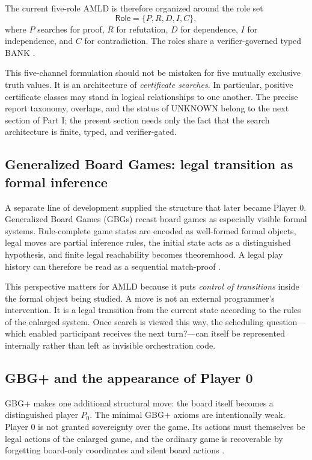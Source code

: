 \documentclass[11pt]{article}
\begin{document}
The current five-role AMLD is therefore organized around the role set
\[
\mathsf{Role}=\{P,R,D,I,C\},
\]
where $P$ searches for proof, $R$ for refutation, $D$ for dependence, $I$ for independence, and $C$ for contradiction. The roles share a verifier-governed typed BANK \cite{roundrobin}.

This five-channel formulation should not be mistaken for five mutually exclusive truth values. It is an architecture of \emph{certificate searches}. In particular, positive certificate classes may stand in logical relationships to one another. The precise report taxonomy, overlaps, and the status of UNKNOWN belong to the next section of Part I; the present section needs only the fact that the search architecture is finite, typed, and verifier-gated.

\subsection{Generalized Board Games: legal transition as formal inference}

A separate line of development supplied the structure that later became Player 0. Generalized Board Games (GBGs) recast board games as especially visible formal systems. Rule-complete game states are encoded as well-formed formal objects, legal moves are partial inference rules, the initial state acts as a distinguished hypothesis, and finite legal reachability becomes theoremhood. A legal play history can therefore be read as a sequential match-proof \cite{gbg}.

This perspective matters for AMLD because it puts \emph{control of transitions} inside the formal object being studied. A move is not an external programmer's intervention. It is a legal transition from the current state according to the rules of the enlarged system. Once search is viewed this way, the scheduling question---which enabled participant receives the next turn?---can itself be represented internally rather than left as invisible orchestration code.

\subsection{GBG+ and the appearance of Player 0}

GBG+ makes one additional structural move: the board itself becomes a distinguished player $P_0$. The minimal GBG+ axioms are intentionally weak. Player 0 is not granted sovereignty over the game. Its actions must themselves be legal actions of the enlarged game, and the ordinary game is recoverable by forgetting board-only coordinates and silent board actions \cite{gbgplus}.
\end{document}
